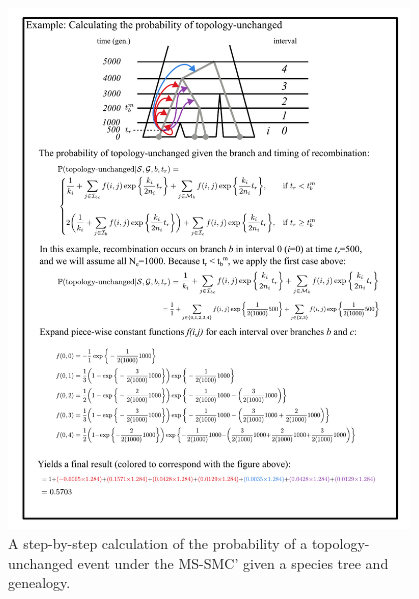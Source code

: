 \documentclass[11pt]{article}
\begin{document}
\begin{figure}[p]
	\centering
	\includegraphics[width=0.95\textwidth]{figures/verbose-equations-topology}
	\caption{A step-by-step calculation of the probability of a topology-unchanged 
	event under the MS-SMC' given a species tree and genealogy.
	}
	\label{fig:figS-topo-equations}
\end{figure}



\end{document}
